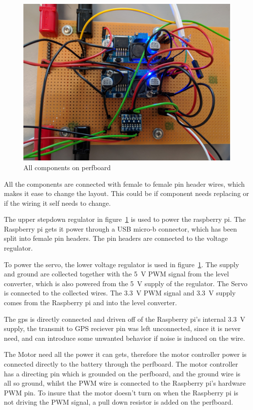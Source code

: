 \begin{figure}[h]
\centering
\includegraphics[width=0.7\linewidth]{Images/Implementation/integration}
\caption{All components on perfboard}
\label{fig:integration}
\end{figure}

All the components are connected with female to female pin header wires, which makes it ease to change the layout. This could be if component needs replacing or if the wiring it self needs to change.

The upper stepdown regulator in figure~\ref{fig:integration} is used to power the raspberry pi. The Raspberry pi gets it power through a USB micro-b connector, which has been split into female pin headers. The pin headers are connected to the voltage regulator. 

To power the servo, the lower voltage regulator is used in figure~\ref{fig:integration}. The supply and ground are collected together with the 5~V PWM signal from the level converter, which is also powered from the 5~V supply of the regulator. The Servo is connected to the collected wires. The 3.3~V PWM signal and 3.3~V supply comes from the Raspberry pi and into the level converter.

The gps is directly connected and driven off of the Raspberry pi's internal 3.3~V supply, the transmit to GPS reciever pin was left unconnected, since it is never need, and can introduce some unwanted behavior if noise is induced on the wire.

The Motor need all the power it can gets, therefore the motor controller power is connected directly to the battery through the perfboard. The motor controller has a directing pin which is grounded on the perfboard, and the ground wire is all so ground, whilst the PWM wire is connected to the Raspberry pi's hardware PWM pin. To insure that the motor doesn't turn on when the Raspberry pi is not driving the PWM signal, a pull down resistor is added on the perfboard. 


